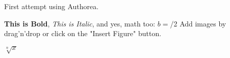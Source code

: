 First attempt using Authorea.

\textbf{This is Bold}, \textit{This is Italic}, and yes, math too: $b = $\sqr[4ac]/2 Add images by drag'n'drop or click on the "Insert Figure" button.

$\sqrt[n]{x}$